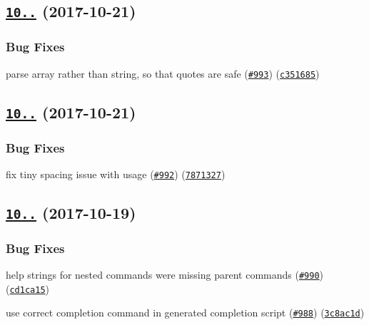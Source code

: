  \subsection*{\href{https://github.com/yargs/yargs/compare/v10.0.2...v10.0.3}{\tt 10..} (2017-\/10-\/21)}

\subsubsection*{Bug Fixes}


\begin{DoxyItemize}
\item parse array rather than string, so that quotes are safe (\href{https://github.com/yargs/yargs/issues/993}{\tt \#993}) (\href{https://github.com/yargs/yargs/commit/c351685}{\tt c351685})
\end{DoxyItemize}

\label{_10.0.2}%
 \subsection*{\href{https://github.com/yargs/yargs/compare/v10.0.1...v10.0.2}{\tt 10..} (2017-\/10-\/21)}

\subsubsection*{Bug Fixes}


\begin{DoxyItemize}
\item fix tiny spacing issue with usage (\href{https://github.com/yargs/yargs/issues/992}{\tt \#992}) (\href{https://github.com/yargs/yargs/commit/7871327}{\tt 7871327})
\end{DoxyItemize}

\label{_10.0.1}%
 \subsection*{\href{https://github.com/yargs/yargs/compare/v10.0.0...v10.0.1}{\tt 10..} (2017-\/10-\/19)}

\subsubsection*{Bug Fixes}


\begin{DoxyItemize}
\item help strings for nested commands were missing parent commands (\href{https://github.com/yargs/yargs/issues/990}{\tt \#990}) (\href{https://github.com/yargs/yargs/commit/cd1ca15}{\tt cd1ca15})
\item use correct completion command in generated completion script (\href{https://github.com/yargs/yargs/issues/988}{\tt \#988}) (\href{https://github.com/yargs/yargs/commit/3c8ac1d}{\tt 3c8ac1d})
\end{DoxyItemize}

